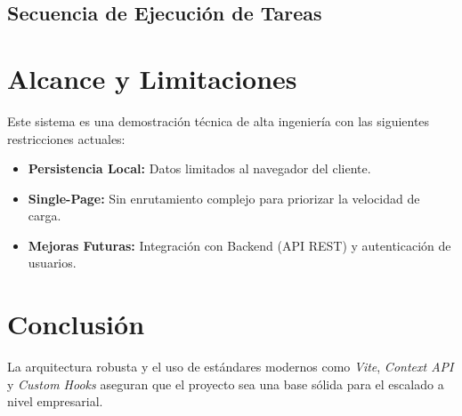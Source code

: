 \documentclass[12pt,a4paper]{article}
\begin{document}
\subsection{Secuencia de Ejecución de Tareas}
\begin{center}
\end{center}

\section{Alcance y Limitaciones}
Este sistema es una demostración técnica de alta ingeniería con las siguientes restricciones actuales:
\begin{itemize}
    \item \textbf{Persistencia Local:} Datos limitados al navegador del cliente.
    \item \textbf{Single-Page:} Sin enrutamiento complejo para priorizar la velocidad de carga.
    \item \textbf{Mejoras Futuras:} Integración con Backend (API REST) y autenticación de usuarios.
\end{itemize}

\section{Conclusión}
La arquitectura robusta y el uso de estándares modernos como \textit{Vite}, \textit{Context API} y \textit{Custom Hooks} aseguran que el proyecto sea una base sólida para el escalado a nivel empresarial.
\end{document}
